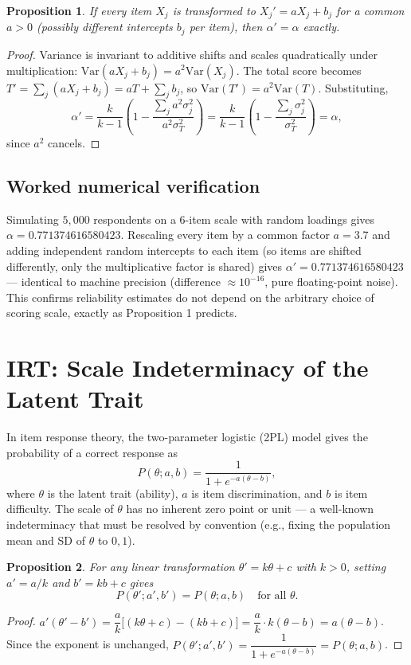 \documentclass[10pt,journal,compsoc]{IEEEtran}
\newtheorem{proposition}{Proposition}
\begin{document}
\begin{proposition}
If every item $X_j$ is transformed to $X_j' = aX_j + b_j$ for a common $a>0$ (possibly different intercepts $b_j$ per item), then $\alpha' = \alpha$ exactly.
\end{proposition}
\begin{proof}
Variance is invariant to additive shifts and scales quadratically under multiplication: $\mathrm{Var}(aX_j+b_j) = a^2\mathrm{Var}(X_j)$. The total score becomes $T' = \sum_j(aX_j+b_j) = aT + \sum_j b_j$, so $\mathrm{Var}(T') = a^2\mathrm{Var}(T)$. Substituting,
\begin{equation}
    \alpha' = \frac{k}{k-1}\left(1-\frac{\sum_j a^2\sigma_j^2}{a^2\sigma_T^2}\right) = \frac{k}{k-1}\left(1-\frac{\sum_j\sigma_j^2}{\sigma_T^2}\right) = \alpha,
\end{equation}
since $a^2$ cancels.
\end{proof}

\subsection{Worked numerical verification}
Simulating $5{,}000$ respondents on a $6$-item scale with random loadings gives $\alpha = 0.771374616580423$. Rescaling every item by a common factor $a=3.7$ and adding independent random intercepts to each item (so items are shifted differently, only the multiplicative factor is shared) gives $\alpha' = 0.771374616580423$ — identical to machine precision (difference $\approx 10^{-16}$, pure floating-point noise). This confirms reliability estimates do not depend on the arbitrary choice of scoring scale, exactly as Proposition 1 predicts.

\section{IRT: Scale Indeterminacy of the Latent Trait}
In item response theory, the two-parameter logistic (2PL) model gives the probability of a correct response as
\begin{equation}
    P(\theta;a,b) = \frac{1}{1+e^{-a(\theta-b)}},
\end{equation}
where $\theta$ is the latent trait (ability), $a$ is item discrimination, and $b$ is item difficulty. The scale of $\theta$ has no inherent zero point or unit — a well-known indeterminacy that must be resolved by convention (e.g., fixing the population mean and SD of $\theta$ to $0,1$).

\begin{proposition}
For any linear transformation $\theta' = k\theta+c$ with $k>0$, setting $a' = a/k$ and $b' = kb+c$ gives
\begin{equation}
    P(\theta';a',b') = P(\theta;a,b) \quad \text{for all } \theta.
\end{equation}
\end{proposition}
\begin{proof}
$a'(\theta'-b') = \dfrac{a}{k}\big[(k\theta+c) - (kb+c)\big] = \dfrac{a}{k}\cdot k(\theta-b) = a(\theta-b)$. Since the exponent is unchanged, $P(\theta';a',b')=\dfrac{1}{1+e^{-a(\theta-b)}}=P(\theta;a,b)$.
\end{proof}
\end{document}
